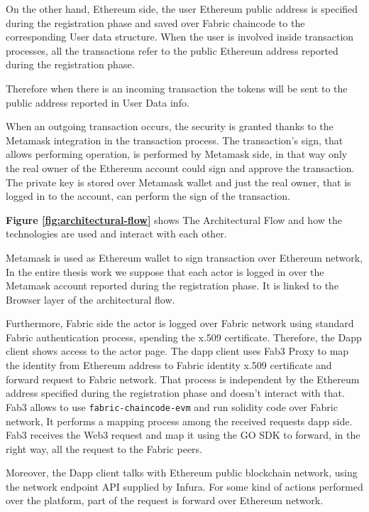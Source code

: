 On the other hand, Ethereum side, the user Ethereum public address is specified
during the registration phase and saved over Fabric chaincode to the corresponding User data structure.
When the user is involved inside transaction processes, all the transactions refer to the public Ethereum
address reported during the registration phase. 
\newline 

Therefore when there is an incoming transaction the tokens will be sent to the public address reported in User Data info. 
\newline

When an outgoing transaction occurs, the security is granted thanks to the Metamask integration in the 
transaction process. The transaction's sign, that allows performing operation, is performed by Metamask side, 
in that way only the real owner of the Ethereum account could sign and approve the transaction. The private 
key is stored over Metamask wallet and just the real owner, that is logged in to the account, can perform 
the sign of the transaction. 
\bigskip

\textbf{Figure \ref{fig:architectural-flow}} shows The Architectural Flow and how the technologies are used 
and interact with each other.

Metamask is used as Ethereum wallet to sign transaction over Ethereum network, In the entire thesis work we 
suppose that each actor is logged in over the Metamask account reported during the registration phase. It is 
linked to the Browser layer of the architectural flow.  

Furthermore, Fabric side the actor is logged over Fabric network using standard Fabric authentication
process, spending the x.509 certificate. Therefore, the Dapp client shows access to the actor page.
The dapp client uses Fab3 Proxy to map the identity from Ethereum address to Fabric
identity x.509 certificate and forward request to Fabric network. That process is independent by the Ethereum address
specified during the registration phase and doesn't interact with that. Fab3 allows to use \texttt{fabric-chaincode-evm} 
and run solidity code over Fabric network, It performs a mapping process among the received requests dapp side.
Fab3 receives the Web3 request and map it using the GO SDK to forward, in the right way, all the request
to the Fabric peers. 
\bigskip

Moreover, the Dapp client talks with Ethereum public blockchain network, using the network endpoint API supplied by Infura. 
For some kind of actions performed over the platform, part of the request is forward over Ethereum network. 

